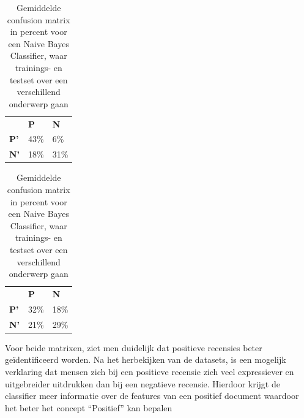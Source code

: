 \begin{table}[h]
\centering
\setlength\tabcolsep{4pt}
\begin{minipage}{0.48\textwidth}
\centering
\begin{tabular}{lll}
                                 & \textbf{P}               & \textbf{N}               \\ \cline{2-3} 
\multicolumn{1}{l|}{\textbf{P'}} & \multicolumn{1}{l|}{43\%} & \multicolumn{1}{l|}{6\%} \\ \cline{2-3} 
\multicolumn{1}{l|}{\textbf{N'}} & \multicolumn{1}{l|}{18\%} & \multicolumn{1}{l|}{31\%} \\ \cline{2-3} 
\end{tabular}
\caption{Gemiddelde confusion matrix in percent voor een Naive Bayes Classifier, waar trainings- en testset over hetzelfde onderwerp gaan}
\end{minipage}%
\hfill
\begin{minipage}{0.48\textwidth}
\centering
\begin{tabular}{lll}
                                 & \textbf{P}               & \textbf{N}               \\ \cline{2-3} 
\multicolumn{1}{l|}{\textbf{P'}} & \multicolumn{1}{l|}{32\%} & \multicolumn{1}{l|}{18\%} \\ \cline{2-3} 
\multicolumn{1}{l|}{\textbf{N'}} & \multicolumn{1}{l|}{21\%} & \multicolumn{1}{l|}{29\%} \\ \cline{2-3} 
\end{tabular}
\caption{Gemiddelde confusion matrix in percent voor een Naive Bayes Classifier, waar trainings- en testset over een verschillend onderwerp gaan} 
\end{minipage}
\end{table}


Voor beide matrixen, ziet men duidelijk dat positieve recensies beter ge\"identificeerd worden. Na het herbekijken van de datasets, is een mogelijk verklaring dat mensen zich bij een positieve recensie zich veel expressiever en uitgebreider uitdrukken dan bij een negatieve recensie. Hierdoor krijgt de classifier meer informatie over de features van een positief document waardoor het beter het concept ``Positief'' kan bepalen 
